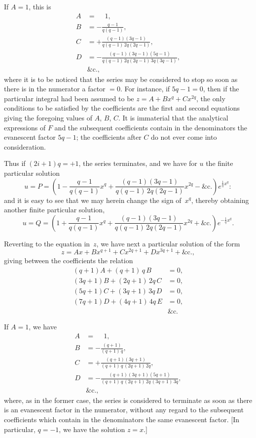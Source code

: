 \documentclass[11pt,a4paper]{article}
\theoremstyle{plain}
\theoremstyle{definition}
\begin{document}
If $A=1$, this is
\begin{align*}
A &= \phantom{-}1, \\
B &= -\frac{q-1}{q(q-1)}, \\
C &= +\frac{(q-1)(3q-1)}{q(q-1)\,2q(2q-1)}, \\
D &= -\frac{(q-1)(3q-1)(5q-1)}{q(q-1)\,2q(2q-1)\,3q(3q-1)}, \\
&\&\text{c.},
\end{align*}
where it is to be noticed that the series may be considered to stop so soon as
there is in the numerator a factor $=0$.  For instance, if $5q-1=0$, then if the
particular integral had been assumed to be $z = A + Bx^q + Cx^{2q}$, the only
conditions to be satisfied by the coefficients are the first and second equations
giving the foregoing values of $A$, $B$, $C$.  It is immaterial that the analytical
expressions of $F$ and the subsequent coefficients contain in the denominators the
evanescent factor $5q-1$; the coefficients after $C$ do not ever come into consideration.

Thus if $(2i+1)q = +1$, the series terminates, and we have for $u$ the finite
particular solution
\[
u = P = \left(1 - \frac{q-1}{q(q-1)}x^q + \frac{(q-1)(3q-1)}{q(q-1)\,2q(2q-1)}x^{2q} - \&\text{c.}\right)
e^{\frac{1}{q}x^q}:
\]
and it is easy to see that we may herein change the sign of~$x^q$, thereby obtaining
another finite particular solution,
\[
u = Q = \left(1 + \frac{q-1}{q(q-1)}x^q + \frac{(q-1)(3q-1)}{q(q-1)\,2q(2q-1)}x^{2q}
+ \&\text{c.}\right) e^{-\frac{1}{q}x^q}.
\]

Reverting to the equation in~$z$, we have next a particular solution of the form
\[
z = Ax + Bx^{q+1} + Cx^{2q+1} + Dx^{3q+1} + \&\text{c.},
\]
giving between the coefficients the relation
\begin{align*}
(q+1)A + (q+1)\,q\,B &= 0, \\
(3q+1)B + (2q+1)\,2q\,C &= 0, \\
(5q+1)C + (3q+1)\,3q\,D &= 0, \\
(7q+1)D + (4q+1)\,4q\,E &= 0, \\
&\&\text{c.}
\end{align*}

If $A=1$, we have
\begin{align*}
A &= \phantom{-}1, \\
B &= -\frac{(q+1)}{(q+1)\,q}, \\
C &= +\frac{(q+1)(3q+1)}{(q+1)\,q\,(2q+1)\,2q}, \\
D &= -\frac{(q+1)(3q+1)(5q+1)}{(q+1)\,q\,(2q+1)\,2q\,(3q+1)\,3q}, \\
&\&\text{c.},
\end{align*}
where, as in the former case, the series is considered to terminate as soon as there
is an evanescent factor in the numerator, without any regard to the subsequent
coefficients which contain in the denominators the same evanescent factor.
[In particular, $q=-1$, we have the solution $z=x$.]
\end{document}
